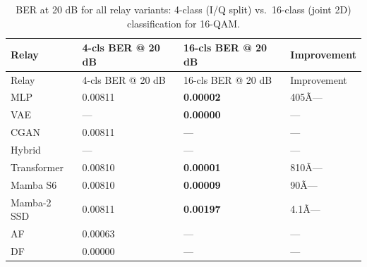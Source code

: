\begin{longtable}[]{@{}llll@{}}
\caption{BER at 20 dB for all relay variants: 4-class (I/Q split) vs.~16-class (joint 2D) classification for 16-QAM.}\label{tbl:table24}\tabularnewline
\toprule\noalign{}
Relay & 4-cls BER @ 20 dB & 16-cls BER @ 20 dB & Improvement \\
\midrule\noalign{}
\endfirsthead
\toprule\noalign{}
Relay & 4-cls BER @ 20 dB & 16-cls BER @ 20 dB & Improvement \\
\midrule\noalign{}
\endhead
\bottomrule\noalign{}
\endlastfoot
MLP & 0.00811 & \textbf{0.00002} & 405Ã— \\
VAE & --- & \textbf{0.00000} & --- \\
CGAN & 0.00811 & --- & --- \\
Hybrid & --- & --- & --- \\
Transformer & 0.00810 & \textbf{0.00001} & 810Ã— \\
Mamba S6 & 0.00810 & \textbf{0.00009} & 90Ã— \\
Mamba-2 SSD & 0.00811 & \textbf{0.00197} & 4.1Ã— \\
AF & 0.00063 & --- & --- \\
DF & 0.00000 & --- & --- \\
\end{longtable}